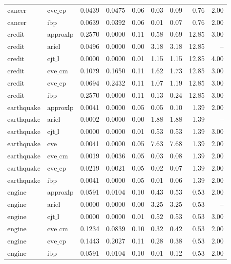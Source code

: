 \documentclass{article}
\begin{document}
\begin{table}[ht]
\begin{tabular}{llrrrrrrr}
$\text{cancer}$ & $\text{cve\_cp}$ & 0.0439 & 0.0475 & 0.06 & 0.03 & 0.09 & 0.76 & 2.00 \\
$\text{cancer}$ & ibp & 0.0639 & 0.0392 & 0.06 & 0.01 & 0.07 & 0.76 & 2.00 \\
\hline
$\text{credit}$ & approxlp & 0.2570 & 0.0000 & 0.11 & 0.58 & 0.69 & 12.85 & 3.00 \\
$\text{credit}$ & ariel & 0.0496 & 0.0000 & 0.00 & 3.18 & 3.18 & 12.85 & -- \\
$\text{credit}$ & $\text{cjt\_l}$ & 0.0000 & 0.0000 & 0.01 & 1.15 & 1.15 & 12.85 & 4.00 \\
$\text{credit}$ & $\text{cve\_cm}$ & 0.1079 & 0.1650 & 0.11 & 1.62 & 1.73 & 12.85 & 3.00 \\
$\text{credit}$ & $\text{cve\_cp}$ & 0.0694 & 0.2432 & 0.11 & 1.07 & 1.19 & 12.85 & 3.00 \\
$\text{credit}$ & ibp & 0.2570 & 0.0000 & 0.11 & 0.13 & 0.24 & 12.85 & 3.00 \\
\hline
$\text{earthquake}$ & approxlp & 0.0041 & 0.0000 & 0.05 & 0.05 & 0.10 & 1.39 & 2.00 \\
$\text{earthquake}$ & ariel & 0.0002 & 0.0000 & 0.00 & 1.88 & 1.88 & 1.39 & -- \\
$\text{earthquake}$ & $\text{cjt\_l}$ & 0.0000 & 0.0000 & 0.01 & 0.53 & 0.53 & 1.39 & 3.00 \\
$\text{earthquake}$ & cve & 0.0041 & 0.0000 & 0.05 & 7.63 & 7.68 & 1.39 & 2.00 \\
$\text{earthquake}$ & $\text{cve\_cm}$ & 0.0019 & 0.0036 & 0.05 & 0.03 & 0.08 & 1.39 & 2.00 \\
$\text{earthquake}$ & $\text{cve\_cp}$ & 0.0219 & 0.0021 & 0.05 & 0.02 & 0.07 & 1.39 & 2.00 \\
$\text{earthquake}$ & ibp & 0.0041 & 0.0000 & 0.05 & 0.01 & 0.06 & 1.39 & 2.00 \\
\hline
$\text{engine}$ & approxlp & 0.0591 & 0.0104 & 0.10 & 0.43 & 0.53 & 0.53 & 2.00 \\
$\text{engine}$ & ariel & 0.0000 & 0.0000 & 0.00 & 3.25 & 3.25 & 0.53 & -- \\
$\text{engine}$ & $\text{cjt\_l}$ & 0.0000 & 0.0000 & 0.01 & 0.52 & 0.53 & 0.53 & 3.00 \\
$\text{engine}$ & $\text{cve\_cm}$ & 0.1234 & 0.0839 & 0.10 & 0.32 & 0.42 & 0.53 & 2.00 \\
$\text{engine}$ & $\text{cve\_cp}$ & 0.1443 & 0.2027 & 0.11 & 0.28 & 0.38 & 0.53 & 2.00 \\
$\text{engine}$ & ibp & 0.0591 & 0.0104 & 0.10 & 0.01 & 0.12 & 0.53 & 2.00 \\

\end{tabular}
\end{table}
\end{document}
